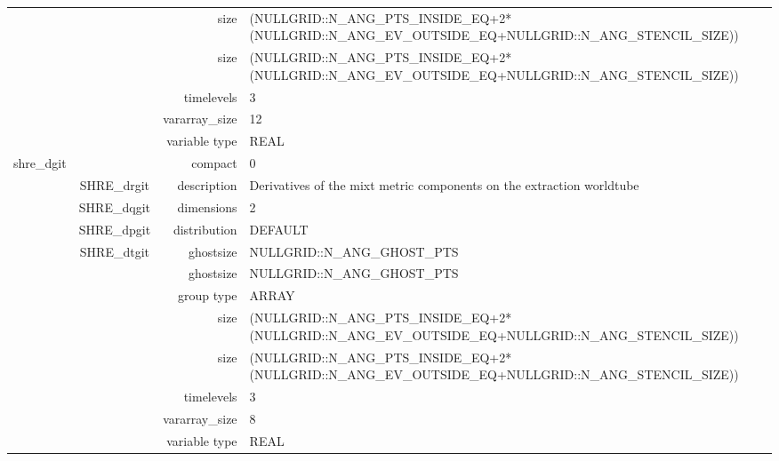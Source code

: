 \begin{tabular*}{150mm}{|c|c@{\extracolsep{\fill}}|rl|}
 &  & size & (NULLGRID::N\_ANG\_PTS\_INSIDE\_EQ+2*(NULLGRID::N\_ANG\_EV\_OUTSIDE\_EQ+NULLGRID::N\_ANG\_STENCIL\_SIZE)) \\ 
& ~ & size & (NULLGRID::N\_ANG\_PTS\_INSIDE\_EQ+2*(NULLGRID::N\_ANG\_EV\_OUTSIDE\_EQ+NULLGRID::N\_ANG\_STENCIL\_SIZE)) \\ 
 &  & timelevels & 3 \\ 
 &  & vararray\_size & 12 \\ 
 &  & variable type & REAL \\ 
\hline 
shre\_dgit &  & compact & 0 \\ 
 & SHRE\_drgit & description & Derivatives of the mixt metric components on the extraction worldtube \\ 
 & SHRE\_dqgit & dimensions & 2 \\ 
 & SHRE\_dpgit & distribution & DEFAULT \\ 
 & SHRE\_dtgit & ghostsize & NULLGRID::N\_ANG\_GHOST\_PTS \\ 
& ~ & ghostsize & NULLGRID::N\_ANG\_GHOST\_PTS \\ 
 &  & group type & ARRAY \\ 
 &  & size & (NULLGRID::N\_ANG\_PTS\_INSIDE\_EQ+2*(NULLGRID::N\_ANG\_EV\_OUTSIDE\_EQ+NULLGRID::N\_ANG\_STENCIL\_SIZE)) \\ 
& ~ & size & (NULLGRID::N\_ANG\_PTS\_INSIDE\_EQ+2*(NULLGRID::N\_ANG\_EV\_OUTSIDE\_EQ+NULLGRID::N\_ANG\_STENCIL\_SIZE)) \\ 
 &  & timelevels & 3 \\ 
 &  & vararray\_size & 8 \\ 
 &  & variable type & REAL \\ 
\hline 
\end{tabular*} 



\vspace{5mm}
\vspace{5mm}

